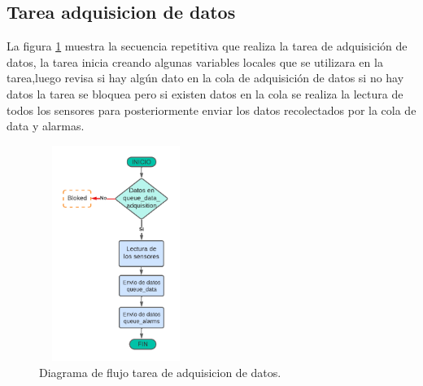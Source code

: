 \subsection{Tarea adquisicion de datos} 
La figura \ref{fig:Df tarea adquisicion} muestra la secuencia repetitiva que realiza la tarea de adquisición de datos, la tarea inicia creando algunas variables locales que se utilizara en la tarea,luego revisa si hay algún dato en la cola de adquisición de datos si no hay datos la tarea se bloquea pero si existen datos en la cola se realiza la lectura de todos los sensores para posteriormente enviar los datos recolectados por la cola de data y alarmas.

\begin{figure}[h]
  \centering
	\includegraphics[width=5cm, height=7cm]{./Figures/DF task adquisicion.png}
	\caption{Diagrama de flujo tarea de adquisicion de datos.}
	\label{fig:Df tarea adquisicion}
\end{figure}

